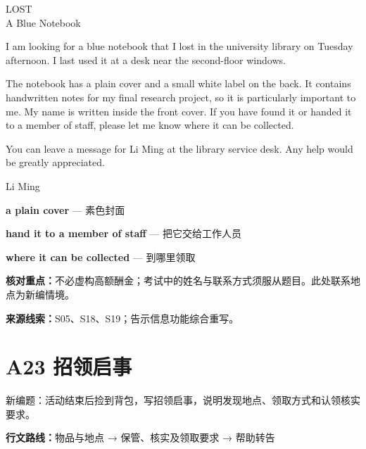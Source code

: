 \documentclass[11pt,a4paper,fontset=macnew]{ctexart}
\newenvironment{example}{\begingroup\fontsize{11}{14.3}\selectfont\setlength{\parskip}{4pt}}{\par\endgroup}
\begin{document}
\begin{example}
{\centering LOST\\A Blue Notebook\par}
I am looking for a blue notebook that I lost in the university library on Tuesday afternoon. I last used it at a desk near the second-floor windows.

The notebook has a plain cover and a small white label on the back. It contains handwritten notes for my final research project, so it is particularly important to me. My name is written inside the front cover. If you have found it or handed it to a member of staff, please let me know where it can be collected.

You can leave a message for Li Ming at the library service desk. Any help would be greatly appreciated.

\noindent Li Ming\par
\end{example}
\par\vspace{4pt}{\bfseries 好词好句：优先记这三处}\par\nopagebreak
{\small\textbf{a plain cover} — 素色封面}\par
{\small\textbf{hand it to a member of staff} — 把它交给工作人员}\par
{\small\textbf{where it can be collected} — 到哪里领取}\par
{\small\textbf{核对重点：}不必虚构高额酬金；考试中的姓名与联系方式须服从题目。此处联系地点为新编情境。}\par
{\fontsize{8}{10}\selectfont\textbf{来源线索：}S05、S18、S19；告示信息功能综合重写。}\par
\clearpage\section*{A23  招领启事}
{\small 新编题：活动结束后捡到背包，写招领启事，说明发现地点、领取方式和认领核实要求。}\par
{\small\textbf{行文路线：}物品与地点 → 保管、核实及领取要求 → 帮助转告}\par
\par\vspace{4pt}{\bfseries 可替换模板}\par\nopagebreak
\end{document}
